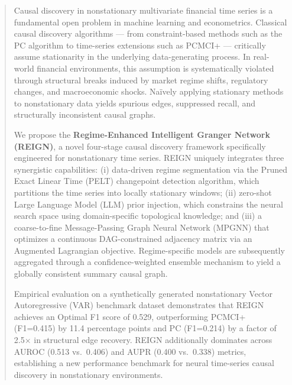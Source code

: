 \begin{abstract}
Causal discovery in nonstationary multivariate financial time series is a fundamental open problem in machine learning and econometrics. Classical causal discovery algorithms — from constraint-based methods such as the PC algorithm to time-series extensions such as PCMCI+ — critically assume stationarity in the underlying data-generating process. In real-world financial environments, this assumption is systematically violated through structural breaks induced by market regime shifts, regulatory changes, and macroeconomic shocks. Naïvely applying stationary methods to nonstationary data yields spurious edges, suppressed recall, and structurally inconsistent causal graphs.

We propose the \textbf{Regime-Enhanced Intelligent Granger Network (REIGN)}, a novel four-stage causal discovery framework specifically engineered for nonstationary time series. REIGN uniquely integrates three synergistic capabilities: (i) data-driven regime segmentation via the Pruned Exact Linear Time (PELT) changepoint detection algorithm, which partitions the time series into locally stationary windows; (ii) zero-shot Large Language Model (LLM) prior injection, which constrains the neural search space using domain-specific topological knowledge; and (iii) a coarse-to-fine Message-Passing Graph Neural Network (MPGNN) that optimizes a continuous DAG-constrained adjacency matrix via an Augmented Lagrangian objective. Regime-specific models are subsequently aggregated through a confidence-weighted ensemble mechanism to yield a globally consistent summary causal graph.

Empirical evaluation on a synthetically generated nonstationary Vector Autoregressive (VAR) benchmark dataset demonstrates that REIGN achieves an Optimal F1 score of 0.529, outperforming PCMCI+ (F1=0.415) by 11.4 percentage points and PC (F1=0.214) by a factor of 2.5$\times$ in structural edge recovery. REIGN additionally dominates across AUROC (0.513 vs.\ 0.406) and AUPR (0.400 vs.\ 0.338) metrics, establishing a new performance benchmark for neural time-series causal discovery in nonstationary environments.
\end{abstract}
